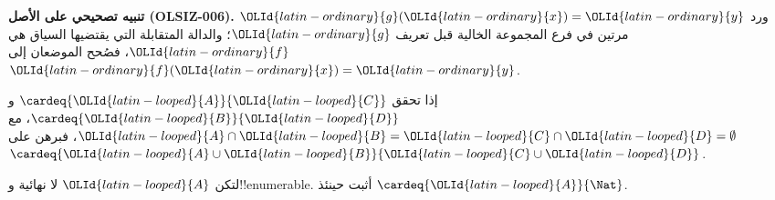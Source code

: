 \documentclass[../../../include/open-logic-section]{subfiles}
\begin{document}
\begin{editorial}
\textbf{تنبيه تصحيحي على الأصل (OLSIZ-006).}
ورد ${\OLId{latin-ordinary}{g}}({\OLId{latin-ordinary}{x}})={\OLId{latin-ordinary}{y}}$ مرتين في فرع المجموعة الخالية قبل تعريف ${\OLId{latin-ordinary}{g}}$؛ والدالة
المتقابلة التي يقتضيها السياق هي ${\OLId{latin-ordinary}{f}}$، فصُحح الموضعان إلى ${\OLId{latin-ordinary}{f}}({\OLId{latin-ordinary}{x}})={\OLId{latin-ordinary}{y}}$.
\end{editorial}

\begin{prob}
إذا تحقق $\cardeq{{\OLId{latin-looped}{A}}}{{\OLId{latin-looped}{C}}}$ و$\cardeq{{\OLId{latin-looped}{B}}}{{\OLId{latin-looped}{D}}}$، مع ${\OLId{latin-looped}{A}} \cap {\OLId{latin-looped}{B}} =
{\OLId{latin-looped}{C}} \cap {\OLId{latin-looped}{D}} = \emptyset$، فبرهن على $\cardeq{{\OLId{latin-looped}{A}} \cup {\OLId{latin-looped}{B}}}{{\OLId{latin-looped}{C}} \cup {\OLId{latin-looped}{D}}}$.
\end{prob}

\begin{prob}
لتكن ${\OLId{latin-looped}{A}}$ لا نهائية و!!{enumerable}. أثبت حينئذ $\cardeq{{\OLId{latin-looped}{A}}}{\Nat}$.
\end{prob}
\end{document}
